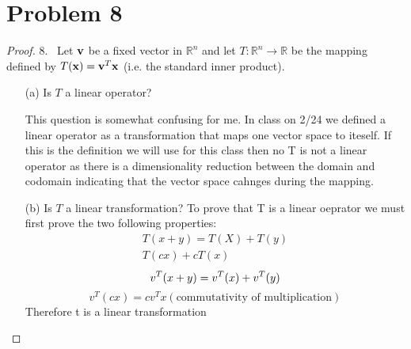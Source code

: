 \documentclass[12pt]{article}
\newcommand{\tab}{\\\\}
\newcommand{\sect}[1]{\section*{#1}}
\begin{document}
\sect{Problem 8}
\begin{proof}
  8.~ Let ${\bf v}$ be a fixed vector in ${\mathbb R}^n$ and let $T: {\mathbb R}^n \rightarrow {\mathbb R}$ be the mapping defined
  by $T({\bf x}) = {\bf v}^T {\bf x}$ (i.e. the standard inner product).
  \begin{itemize}
  \item[(a)] Is $T$ a linear operator?

  This question is somewhat confusing for me. In class on 2/24 we defined a linear operator as a transformation that maps one vector space to iteself. If this is the definition we will use for this class then no T is not a linear operator as there is a dimensionality reduction between the domain and codomain indicating that the vector space cahnges during the mapping.
  \item[(b)] Is $T$ a linear transformation?
  To prove that T is a linear oeprator we must first prove the two following properties:
  \begin{align*}
    T(x+y)=T(X)+T(y)\\
    T(cx)+cT(x)
  \end{align*}
    \[
        v^T(x+y)=v^T(x)+v^T(y)\\
    \]
    \[
    v^T(cx)=cv^Tx (\text{commutativity of multiplication})
    \]
    Therefore t is a linear transformation
  \end{itemize}
  \vskip 10pt
  \noindent
\end{proof}\tab\tab
\end{document}
